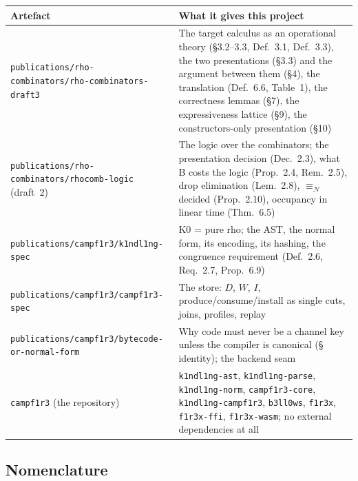 \documentclass[11pt,a4paper]{article}
\newcommand{\code}[1]{\texttt{#1}}
\newcommand{\nequiv}{\equiv_{\mathcal{N}}}
\theoremstyle{definition}
\theoremstyle{plain}
\begin{document}
\begin{center}
\begin{tabularx}{\linewidth}{@{}l>{\raggedright\arraybackslash}X@{}}
\toprule
Artefact & What it gives this project\\
\midrule
\code{publications/rho-combinators/rho-combinators-draft3} & The target
calculus as an operational theory (\S3.2--3.3, Def.~3.1, Def.~3.3), the two
presentations (\S3.3) and the argument between them (\S4), the translation
(Def.~6.6, Table~1), the correctness lemmas (\S7), the expressiveness lattice
(\S9), the constructors-only presentation (\S10)\\
\code{publications/rho-combinators/rhocomb-logic} (draft~2) & The logic over
the combinators; the presentation decision (Dec.~2.3), what B costs the logic
(Prop.~2.4, Rem.~2.5), drop elimination (Lem.~2.8), $\nequiv$ decided
(Prop.~2.10), occupancy in linear time (Thm.~6.5)\\
\code{publications/campf1r3/k1ndl1ng-spec} & K0 = pure rho; the AST, the
normal form, its encoding, its hashing, the congruence requirement
(Def.~2.6, Req.~2.7, Prop.~6.9)\\
\code{publications/campf1r3/campf1r3-spec} & The store: $D$, $W$, $I$,
produce/consume/install as single cuts, joins, profiles, replay\\
\code{publications/campf1r3/bytecode-or-normal-form} & Why code must never be
a channel key unless the compiler is canonical (\S\,identity); the backend
seam\\
\code{campf1r3} (the repository) & \code{k1ndl1ng-ast}, \code{k1ndl1ng-parse},
\code{k1ndl1ng-norm}, \code{campf1r3-core}, \code{k1ndl1ng-campf1r3},
\code{b3ll0ws}, \code{f1r3x}, \code{f1r3x-ffi}, \code{f1r3x-wasm}; no external
dependencies at all\\
\bottomrule
\end{tabularx}
\end{center}

\subsection{Nomenclature}\label{sec:nomen}
\end{document}
